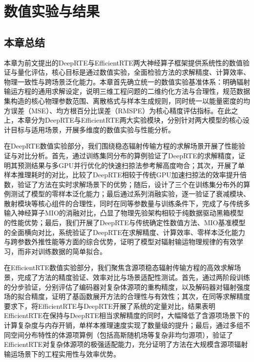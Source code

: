 \chapter{数值实验与结果}





\section{本章总结}

本章为前文提出的DeepRTE与EfficientRTE两大神经算子框架提供系统性的数值验证与量化评估，核心目标是通过数值实验，全面检验方法的求解精度、计算效率、物理一致性与跨场景泛化能力。本章首先确立统一的数值实验基准体系：明确辐射输运方程的通用求解设定，说明三维工程问题的二维约化方法与合理性，规范数据集构造的核心物理参数范围、离散格式与样本生成规则，同时统一以能量密度的均方误差（MSE）、均方根百分比误差（RMSPE）为核心精度评估指标。在此之上，本章分为DeepRTE与EfficientRTE两大实验模块，分别针对两大模型的核心设计目标与适用场景，开展多维度的数值实验与性能分析。

在DeepRTE数值实验部分，我们围绕稳态辐射传输方程的求解场景开展了性能验证与对比分析。首先，通过训练集同分布的算例验证了DeepRTE的求解精度，证明其预测结果与多GPU并行优化的快速扫掠法参考解高度吻合；其次，开展了单样本推理耗时的对比，比较了DeepRTE相较于传统GPU加速扫掠法的效率提升倍数，验证了方法在实时求解场景下的优势；随后，设计了三个在训练集分布外的算例测试了模型的零样本泛化能力；最后通过系列消融实验，逐一验证了衰减模块、散射模块等核心组件的合理性，同时在同等参数量与训练条件下，完成了与传统多输入神经算子MIO的消融对比，凸显了物理先验架构相较于纯数据驱动黑箱模型的性能优势；最后，我们开展了DeepRTE与传统确定性数值方法、MIO基准模型的全面横向对比，系统验证了DeepRTE在求解精度、计算效率、零样本泛化能力与跨参数外推性能等方面的综合优势，证明了模型对辐射输运物理规律的有效学习，而非对训练数据的简单拟合。

在EfficientRTE数值实验部分，我们聚焦含源项稳态辐射传输方程的高效求解场景，完成了方法的精度验证、效率对比与场景适配性测试。首先，通过两阶段训练的分步验证，分别评估了编码器对复杂体源项的重构精度，以及解码器对辐射强度场的拟合精度，证明了基函数展开方法的合理性与有效性；其次，在同等求解精度要求下，将EfficientRTE与DeepRTE开展了系统的定量对比，结果表明EfficientRTE在保持与DeepRTE相当求解精度的同时，大幅降低了含源项场景下的计算复杂度与内存开销，单样本推理速度实现了数量级的提升；最后，通过多组不同空间分布特性的体源项算例（包括高斯随机场等复杂非均匀源项），验证了EfficientRTE对复杂体源项的极强适配能力，充分证明了方法在大规模含源项辐射输运场景下的工程实用性与效率优势。